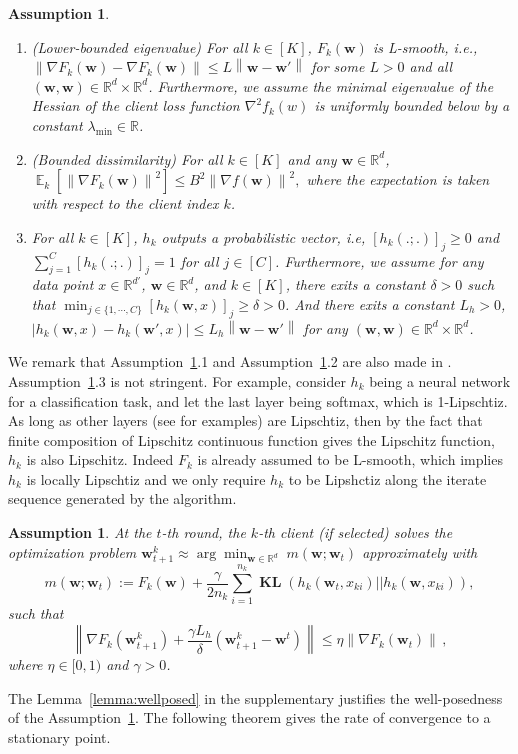 \documentclass{article} %
\newcommand{\w}{\boldsymbol{w}}
\DeclareMathOperator{\E}{\mathbb{E}}
\DeclareMathOperator{\KL}{\boldsymbol{\mathbf{KL}}}
\newcommand{\R}[1]{\mathbb{R}^{#1}}
\newcommand{\norm}[1]{\left\|{#1}\right\|}
\newtheorem{assumption}[theorem]{Assumption}
\begin{document}
 \begin{assumption}\label{ass.fun}
 \item
 \begin{enumerate}
     \item (Lower-bounded eigenvalue) For all $k\in[K]$, $F_k(\w)$ is L-smooth, i.e., $\norm{\nabla F_k(\w) - \nabla F_k(\w)}\leq L\norm{\w-\w'}$ for some $L>0$ and all $(\w,\w)\in \R{d}\times\R{d}$. Furthermore, we assume the minimal eigenvalue of the Hessian of the client loss function $\nabla^2 f_k(w)$ is uniformly bounded below by a constant $\lambda_{\min}\in\mathbb{R}$.
     \item (Bounded dissimilarity) For all $k\in[K]$ and any $\w\in\R{d}$, $\E_k[\norm{\nabla F_k(\w)}^2]\leq B^2\norm{\nabla f(\w)}^2,$ where the expectation is taken with respect to the client index $k$.
    \item For all $k\in[K]$, $h_k$ outputs a probabilistic vector, i.e, $[h_k(.;.)]_j\geq 0$ and $\sum_{j=1}^{C}[h_k(.;.)]_j=1$ for all $j\in[C]$. Furthermore, we assume for any data point $x\in\R{d'}$, $\w\in\R{d}$, and $k\in[K]$, there exits a constant $\delta>0$ such that $\min_{j\in\{1,\cdots, C\}} [h_k(\w,x)]_j \geq \delta >0$. And there exits a constant $L_h>0$, $|h_k(\w,x) - h_k(\w',x)|\leq L_h \norm{\w-\w'}$ for any  $(\w,\w)\in \R{d}\times\R{d}$. 
 \end{enumerate}
 \end{assumption}
 We remark that Assumption~\ref{ass.fun}.1 and Assumption~\ref{ass.fun}.2 are also made in \citep{li2018federated}. Assumption~\ref{ass.fun}.3 is not stringent. For example, consider $h_k$ being a neural network for a classification task, and let the last layer being softmax, which is 1-Lipschtiz. As long as other layers (see \citep{NEURIPS2018_d54e99a6} for examples) are Lipschtiz, then by the fact that finite composition of Lipschitz continuous function gives the Lipschitz function, $h_k$ is also Lipschitz. Indeed $F_k$ is already assumed to be L-smooth, which implies $h_k$ is locally Lipschtiz and we only require $h_k$ to be Lipshctiz along the iterate sequence generated by the algorithm. 
 
\begin{assumption}\label{ass.algo}
  At the $t$-th round, the $k$-th client (if selected) solves the optimization problem  $\w^{k}_{t+1}\approx\arg\min_{\w\in\R{d}}\;m(\w;\w_{t})$ approximately with 
  \begin{equation}
    m(\w;\w_{t}):=F_k(\w) + \frac{\gamma}{2n_k}\sum_{i=1}^{n_k} \KL(h_k(\w_t,x_{ki}) || h_k(\w,x_{ki})), \nonumber
  \end{equation}
  such that 
\begin{equation}\label{eq:inexactness}
    \norm{\nabla F_k(\w^{k}_{t+1}) + \frac{\gamma L_h}{\delta}(\w_{t+1}^k-\w^t)}\leq \eta \norm{\nabla F_k(\w_{t})}\,,
\end{equation}
where $\eta\in [0,1)$ and $\gamma>0$.
\end{assumption}
The Lemma~\ref{lemma:wellposed} in the supplementary justifies the well-posedness of the Assumption~\ref{ass.algo}. The following theorem gives the rate of convergence to a stationary point.
\end{document}
